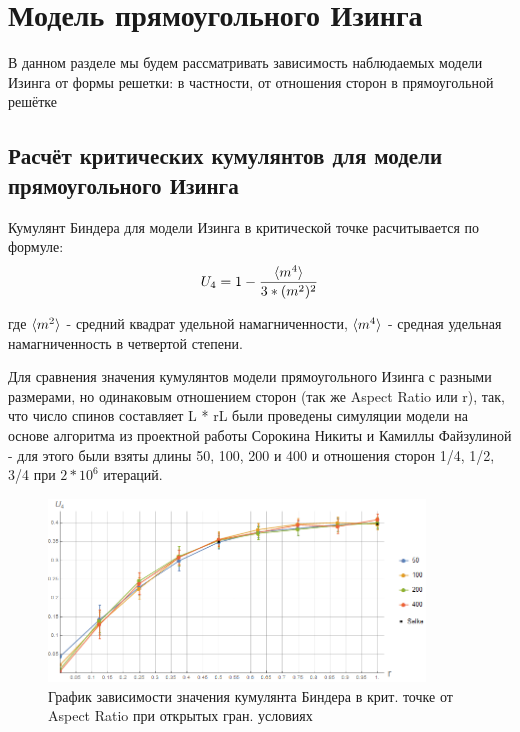 \section{Модель прямоугольного Изинга}

В данном разделе мы будем рассматривать зависимость наблюдаемых модели Изинга от формы решетки: в частности, от отношения сторон в прямоугольной решётке

\subsection{Расчёт критических кумулянтов для модели прямоугольного Изинга}

Кумулянт Биндера для модели Изинга в критической точке расчитывается по формуле:
\begin{equation}
\label{eq:Cumulant}
U_{4} = 1 - \frac{\langle m^{4} \rangle}{3 * (m^{2})^{2}}
\end{equation}

где $\langle m^{2} \rangle$ - средний квадрат удельной намагниченности, $\langle m^{4} \rangle$ - средная удельная намагниченность в четвертой степени. 

Для сравнения значения кумулянтов модели прямоугольного Изинга с разными размерами, но одинаковым отношением сторон (так же Aspect Ratio или r), так, что число спинов составляет L * rL были проведены симуляции модели на основе алгоритма из проектной работы Сорокина Никиты \cite{Schro} и Камиллы Файзулиной \cite{SAW} - для этого были взяты длины 50, 100, 200 и 400 и отношения сторон 1/4, 1/2, 3/4 при $2 * 10^{6}$ итераций.

\begin{figure}[!h]
    \centering
    \includegraphics[width=100mm]{Sections/Images/CumulantOBC.png}
    \caption{График зависимости значения кумулянта Биндера в крит. точке от Aspect Ratio при открытых гран. условиях}
    \label{fig:CumulOBC}
\end{figure}

